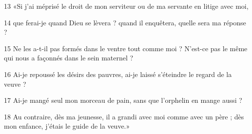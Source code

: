 
13 «Si j’ai méprisé le droit de mon serviteur ou de ma servante en litige avec moi,

14 que ferai-je quand Dieu se lèvera ? quand il enquêtera, quelle sera ma réponse ?

15 Ne les a-t-il pas formés dans le ventre tout comme moi ? N’est-ce pas le même qui nous a façonnés dans le sein maternel ?

16 Ai-je repoussé les désirs des pauvres, ai-je laissé s’éteindre le regard de la veuve ?

17 Ai-je mangé seul mon morceau de pain, sans que l’orphelin en mange aussi ?

18 Au contraire, dès ma jeunesse, il a grandi avec moi comme avec un père ; dès mon enfance, j’étais le guide de la veuve.»